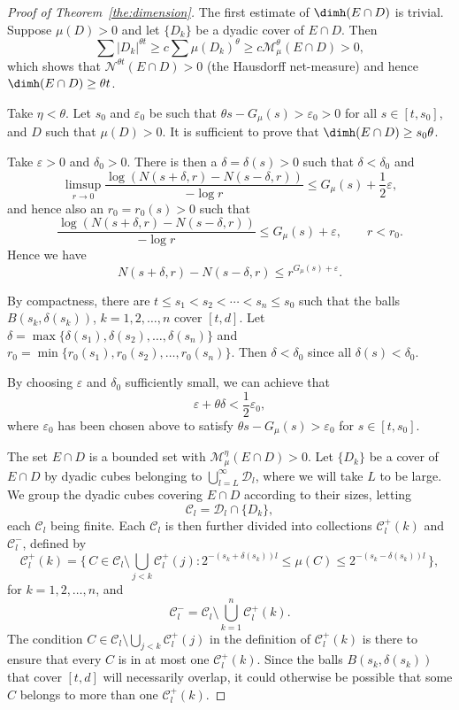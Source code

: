 \begin{proof}[Proof of Theorem~\ref{the:dimension}]
The first estimate of $\dimh (E \cap D)$ is trivial. Suppose $\mu (D) > 0$ and let $\{D_k\}$ be a dyadic cover of $E \cap D$. Then
\[
\sum |D_k|^{\theta t} \geq c \sum \mu (D_k)^\theta \geq c
\mathscr{M}_{\mu}^\theta (E \cap D) > 0,
\]
which shows that $\mathscr{N}^{\theta t} (E \cap D) > 0$ (the Hausdorff net-measure) and hence \linebreak$\dimh (E \cap D) \geq \theta t$.

Take $\eta < \theta$. Let $s_0$ and $\varepsilon_0$ be such that $\theta s - G_\mu (s) > \varepsilon_0 > 0$ for all $s \in [t,s_0]$, and $D$ such that $\mu (D) > 0$. It is sufficient to prove that $\dimh (E \cap D) \geq s_0 \theta$.

Take $\varepsilon > 0$ and $\delta_0 > 0$. There is then a $\delta =
\delta (s) > 0$ such that $\delta < \delta_0$ and
\[
\limsup_{r \to 0} \frac{\log (N(s+\delta, r) - N(s-\delta, r))}{-
\log r} \leq G_\mu (s) + \frac{1}{2} \varepsilon,
\]
and hence also an $r_0 = r_0 (s) > 0$ such that
\[
\frac{\log (N(s+\delta, r) - N(s-\delta, r))}{-
\log r} \leq G_\mu (s) + \varepsilon, \qquad r < r_0.
\]
Hence we have
\begin{equation}\label{eq:numberofcubes}
N(s+\delta, r) - N(s-\delta, r) \leq r^{G_\mu (s) + \varepsilon}.
\end{equation}

By compactness, there are $t \leq s_1 < s_2 < \cdots < s_n \leq s_0$ such that the balls $B(s_k, \delta(s_k))$, $k = 1, 2, \ldots, n$ cover $[t,d]$. Let $\delta = \max \{\delta (s_1), \delta(s_2),
\ldots, \delta(s_n)\}$ and $r_0 = \min \{r_0 (s_1), r_0(s_2),
\ldots, r_0(s_n)\}$. Then $\delta < \delta_0$ since all $\delta (s) < \delta_0$.

By choosing $\varepsilon$ and $\delta_0$ sufficiently small, we can achieve that
\[
\varepsilon + \theta \delta < \frac{1}{2} \varepsilon_0,
\]
where $\varepsilon_0$ has been chosen above to satisfy $\theta s - G_\mu (s) > \varepsilon_0$ for $s \in [t,s_0]$.

The set $E \cap D$ is a bounded set with $\mathscr{M}_\mu^\eta (E
\cap D) > 0$. Let $\{D_k\}$ be a cover of $E \cap D$ by dyadic cubes belonging to $\bigcup_{l = L}^\infty \mathscr{D}_l$, where we will take $L$ to be large. We group the dyadic cubes covering $E \cap D$ according to their sizes, letting
\[
\mathscr{C}_l = \mathscr{D}_l \cap \{D_k\},
\]
each $\mathscr{C}_l$ being finite. Each $\mathscr{C}_l$ is then further divided into collections $\mathscr{C}_l^+ (k)$ and $\mathscr{C}_l^-$, defined by
\[
\mathscr{C}_l^+ (k) = \biggl\{\, C \in \mathscr{C}_l \setminus
\bigcup_{j < k} \mathscr{C}_l^+ (j) : 2^{-(s_k+\delta (s_k))l} \leq
\mu (C) \leq 2^{-(s_k-\delta (s_k))l} \,\biggr\},
\]
for $k = 1,2,\ldots,n$, and
\[
\mathscr{C}_l^- = \mathscr{C}_l \setminus \bigcup_{k=1}^n
\mathscr{C}_l^+ (k).
\]
The condition $C \in \mathscr{C}_l \setminus \bigcup_{j < k}
\mathscr{C}_l^+ (j)$ in the definition of $\mathscr{C}_l^+ (k)$ is there to ensure that every $C$ is in at most one $\mathscr{C}_l^+ (k)$. Since the balls $B (s_k, \delta(s_k))$ that cover $[t,d]$ will necessarily overlap, it could otherwise be possible that some $C$ belongs to more than one $\mathscr{C}_l^+ (k)$.


\end{proof}
